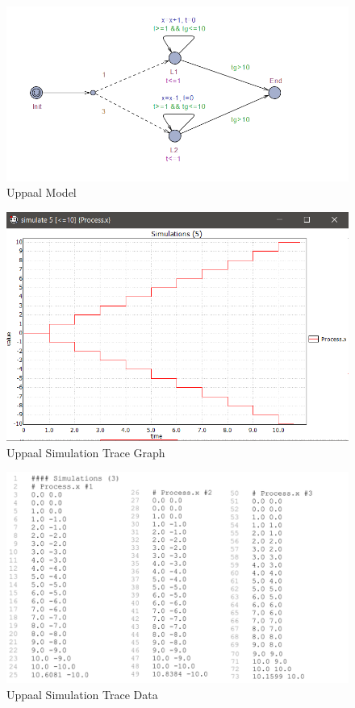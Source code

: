 \begin{figure}[h]
	\centering
	\includegraphics[scale=0.5]{./pictures/uppaal_model_example.png}
	\caption{Uppaal Model}
	\label{uppaal_Model}
\end{figure}

\begin{figure}[h]
	\centering
	\includegraphics[scale=0.6]{./pictures/uppaal_model_example_simulation.png}
	\caption{Uppaal Simulation Trace Graph}
	\label{uppaal_Simulation_Graph}
\end{figure}

\begin{figure}[h]
	\centering
	\includegraphics[scale=0.5]{./pictures/simulation_trace.png}
	\caption{Uppaal Simulation Trace Data}
	\label{uppaal_Simulation_Trace}
\end{figure}

